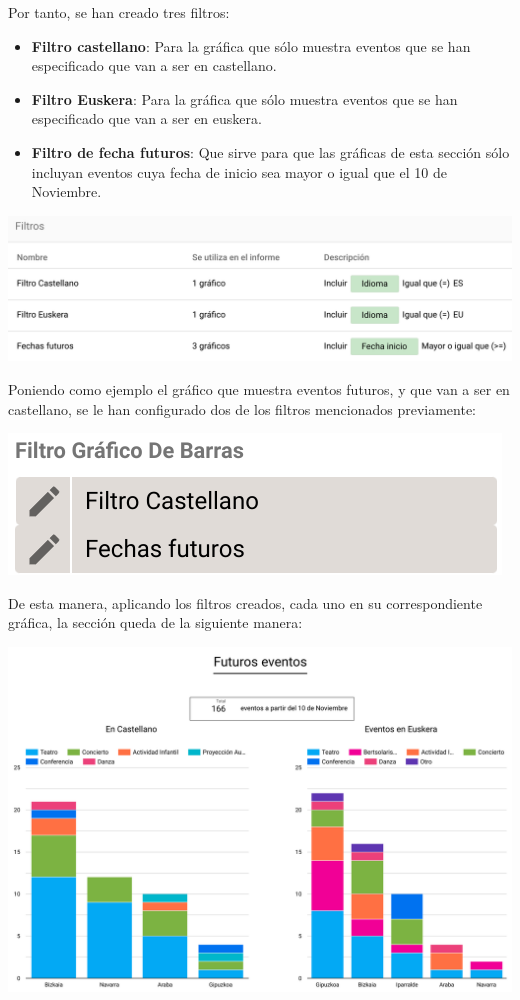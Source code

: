 \documentclass{\ClassPath/viu-tfm-template}
\begin{document}
Por tanto, se han creado tres filtros:
\begin{itemize}
    \item \textbf{Filtro castellano}: Para la gráfica que sólo muestra eventos que se han especificado que van a ser en castellano.
    \item \textbf{Filtro Euskera}: Para la gráfica que sólo muestra eventos que se han especificado que van a ser en euskera.
    \item \textbf{Filtro de fecha futuros}: Que sirve para que las gráficas de esta sección sólo incluyan eventos cuya fecha de inicio sea mayor o igual que el 10 de Noviembre.
\end{itemize}

\begin{center}
    \includegraphics[frame,width=0.9\linewidth]{img/filtros_todos.png}
\end{center}


Poniendo como ejemplo el gráfico que muestra eventos futuros, y que van a ser en castellano, se le han configurado dos de los filtros mencionados previamente:

\begin{center}
    \includegraphics[frame,width=0.45\linewidth]{img/filtros.png}
\end{center}


De esta manera, aplicando los filtros creados, cada uno en su correspondiente gráfica, la sección queda de la siguiente manera:

\begin{center}
    \includegraphics[frame,width=0.9\linewidth]{img/futuro2.png}
\end{center}
\end{document}
